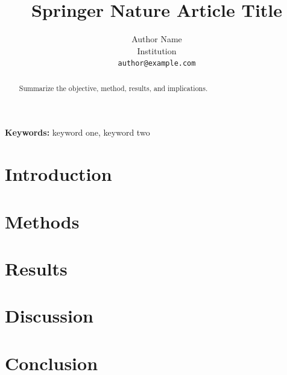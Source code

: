 \documentclass[11pt,letterpaper]{article}
\title{Springer Nature Article Title}
\author{Author Name\\Institution\\\texttt{author@example.com}}
\date{}
\begin{document}
\maketitle

\begin{abstract}
Summarize the objective, method, results, and implications.
\end{abstract}

\noindent\textbf{Keywords:} keyword one, keyword two

\section{Introduction}
\section{Methods}
\section{Results}
\section{Discussion}
\section{Conclusion}

% 
% 
\end{document}
